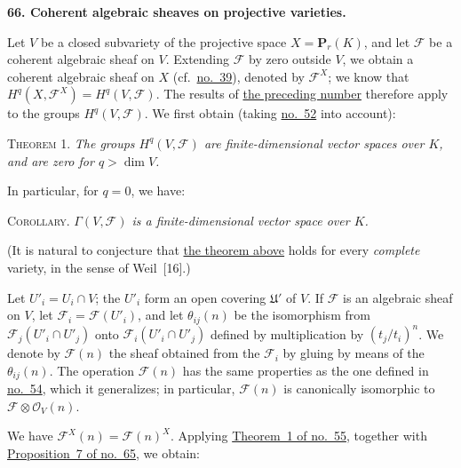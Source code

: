 
\label{fac:III:3:no:66}
\textbf{66. Coherent algebraic sheaves on projective varieties.}

Let $V$ be a closed subvariety of the projective space
$X=\mathbf{P}_r(K)$, and let $\mathcal{F}$ be a coherent algebraic sheaf on
$V$. Extending $\mathcal{F}$ by zero outside $V$, we obtain a coherent
algebraic sheaf on $X$
(cf.\ \hyperref[fac:II:2:no:39]{no.~39}), denoted by $\mathcal{F}^X$; we
know that
$H^q(X,\mathcal{F}^X)=H^q(V,\mathcal{F})$. The results of
\hyperref[fac:III:3:no:65]{the preceding number} therefore apply to the
groups $H^q(V,\mathcal{F})$. We first obtain
(taking \hyperref[fac:III:1:no:52]{no.~52} into account):

\label{fac:III:3:no:66:theorem:1}
\textsc{Theorem 1.} \textit{The groups $H^q(V,\mathcal{F})$ are
finite-dimensional vector spaces over $K$, and are zero for
$q>\dim V$.}

In particular, for $q=0$, we have:

\label{fac:III:3:no:66:corollary}
\textsc{Corollary.} \textit{$\Gamma(V,\mathcal{F})$ is a finite-dimensional
vector space over $K$.}

(It is natural to conjecture that
\hyperref[fac:III:3:no:66:theorem:1]{the theorem above} holds for every
\textit{complete} variety, in the sense of Weil~[16].)

\label{fac:III:3:no:66:construction:twist}
Let $U'_i=U_i\cap V$; the $U'_i$ form an open covering
$\mathfrak{U}'$ of $V$. If $\mathcal{F}$ is an algebraic sheaf on $V$, let
$\mathcal{F}_i=\mathcal{F}(U'_i)$, and let $\theta_{ij}(n)$ be the
isomorphism from $\mathcal{F}_j(U'_i\cap U'_j)$ onto
$\mathcal{F}_i(U'_i\cap U'_j)$ defined by multiplication by
$(t_j/t_i)^n$. We denote by $\mathcal{F}(n)$ the sheaf obtained from the
$\mathcal{F}_i$ by gluing by means of the $\theta_{ij}(n)$. The operation
$\mathcal{F}(n)$ has the same properties as the one defined in
\hyperref[fac:III:2:no:54]{no.~54}, which it generalizes; in particular,
$\mathcal{F}(n)$ is canonically isomorphic to
$\mathcal{F}\otimes\mathcal{O}_V(n)$.

We have $\mathcal{F}^X(n)=\mathcal{F}(n)^X$. Applying
\hyperref[fac:III:2:no:55:theorem:1]{Theorem~1 of no.~55}, together with
\hyperref[fac:III:3:no:65:prop:7]{Proposition~7 of no.~65}, we obtain:

